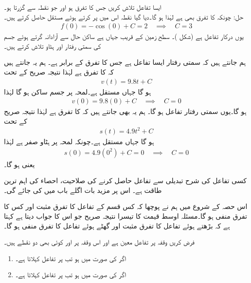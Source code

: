 ایسا تفاعل  تلاش کریں جس کا تفرق  ہو اور جو نقطہ  سے گزرتا ہو۔\\
حل:\quad
چونکہ  کا تفرق بھی  ہے لہٰذا  ہو گا۔دیا گیا نقطہ اس میں پر کرتے ہوئے مستقل حاصل کرتے ہیں۔
\begin{align*}
f(0)=-\cos(0)+C=2\quad \implies\quad C=3
\end{align*} 
یوں درکار تفاعل  ہے (شکل )۔
سطح زمین کے قریب جہاں  ہے ساکن حال سے آزادانہ گرتے ہوئے جسم کی سمتی رفتار اور ہٹاو تلاش کرتے ہیں۔

ہم جانتے ہیں کہ سمتی رفتار  ایسا تفاعل ہے جس کا تفرق  کے برابر ہے۔ ہم یہ جانتے ہیں کہ  کا تفرق  ہے لہٰذا نتیجہ صریح  کے تحت
\begin{align*}
v(t)=9.8t+C
\end{align*}
ہو گا جہاں  مستقل ہے۔لمحہ  پر جسم ساکن ہو گا لہٰذا
\begin{align*}
v(0)=9.8(0)+C\quad \implies \quad C=0 
\end{align*}
ہو گا۔یوں سمتی رفتار تفاعل  ہو گا۔ ہم یہ بھی جانتے ہیں کہ  کا تفرق  ہے لہٰذا  نتیجہ صریح  کے تحت
\begin{align*}
s(t)=4.9t^2+C
\end{align*}
ہو گا جہاں  مستقل ہے۔چونکہ لمحہ  پر ہٹاو صفر ہے لہٰذا
\begin{align*}
s(0)=4.9(0^2)+C=0\quad \implies \quad C=0
\end{align*} 
یعنی  ہو گا۔

کسی تفاعل کی شرح تبدیلی سے تفاعل حاصل کرنے کی صلاحیت، احصاء کی اہم ترین طاقت ہے۔ اس پر مزید بات اگلے باب میں کی جائے گی۔

اس حصہ کے شروع میں ہم نے پوچھا کہ کس قسم کے تفاعل کا تفرق مثبت اور کس کا تفرق منفی ہو گا۔مسئلہ اوسط قیمت کا تیسرا نتیجہ صریح جو اس کا جواب دیتا ہے کہتا ہے کہ بڑھتے ہوئے تفاعل کا تفرق مثبت اور گھٹے ہوئے تفاعل کا تفرق منفی ہو گا۔

فرض کریں وقفہ  پر تفاعل  معین ہے اور اس وقفہ پر  اور  کوئی بھی دو نقطے ہیں۔
\begin{enumerate}[1.]
\item
اگر  کی صورت میں  ہو تب  پر   تفاعل کہلاتا ہے۔
\item
اگر  کی صورت میں  ہو تب  پر   تفاعل کہلاتا  ہے۔
\end{enumerate}

